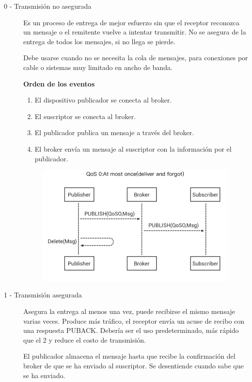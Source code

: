 \documentclass[12pt]{report} %
\begin{document}
\begin{description}
\item[0 - Transmisión no asegurada] Es un proceso de entrega de mejor esfuerzo sin que el receptor reconozca un mensaje o el remitente vuelve a intentar transmitir. No se asegura de la entrega de todos los mensajes, si no llega se pierde.

Debe usarse cuando no se necesita la cola de mensajes, para conexiones por cable o sistemas muy limitado en ancho de banda.

	\textbf{Orden de los eventos}
	\begin{enumerate}
	\item El dispositivo publicador se conecta al broker.
	\item El suscriptor se conecta al broker.
	\item El publicador publica un mensaje a través del broker.
	\item El broker envía un mensaje al suscriptor con la información por el publicador.
	\end{enumerate}

	\begin{figure}[H]
		{\includegraphics[scale=.5]{0_1NSybQWdhHvVhnTb.png}}
	\end{figure}

\item[1 - Transmisión asegurada] Asegura la entrega al menos una vez, puede recibirse el mismo mensaje varias veces. Produce más tráfico, el receptor envía un acuse de recibo con una respuesta PUBACK. Debería ser el uso predeterminado, más rápido que el 2 y reduce el costo de transmisión.

	El publicador almacena el mensaje hasta que recibe la confirmación del broker de que se ha enviado al suscriptor. Se desentiende cuando sabe que se ha enviado.
			

\end{description}
\end{document}
